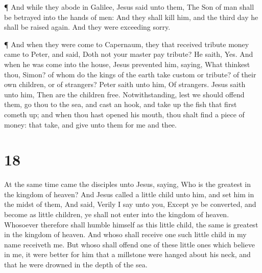  ¶ And while they abode in Galilee, Jesus said unto them,
The Son of man shall be betrayed into the hands of men: 
And they shall kill him, and the third day he shall be raised again. And
they were exceeding sorry.

 ¶ And when they were come to Capernaum, they that received
tribute money came to Peter, and said, Doth not your master pay tribute?
 He saith, Yes. And when he was come into the house, Jesus
prevented him, saying, What thinkest thou, Simon? of whom do the kings
of the earth take custom or tribute? of their own children, or of
strangers?  Peter saith unto him, Of strangers. Jesus saith
unto him, Then are the children free.  Notwithstanding,
lest we should offend them, go thou to the sea, and cast an hook, and
take up the fish that first cometh up; and when thou hast opened his
mouth, thou shalt find a piece of money: that take, and give unto them
for me and thee.

\hypertarget{section-17}{%
\section{18}\label{section-17}}

 At the same time came the disciples unto Jesus, saying, Who
is the greatest in the kingdom of heaven?  And Jesus called
a little child unto him, and set him in the midst of them, 
And said, Verily I say unto you, Except ye be converted, and become as
little children, ye shall not enter into the kingdom of heaven.
 Whosoever therefore shall humble himself as this little
child, the same is greatest in the kingdom of heaven.  And
whoso shall receive one such little child in my name receiveth me.
 But whoso shall offend one of these little ones which
believe in me, it were better for him that a millstone were hanged about
his neck, and that he were drowned in the depth of the sea.

